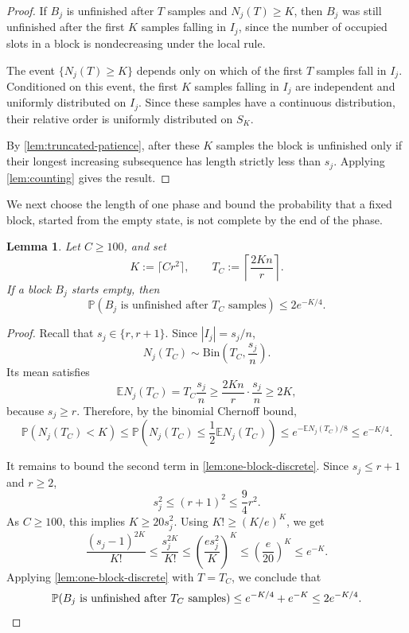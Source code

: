 \documentclass[11pt,reqno,letterpaper]{amsart}
\newtheorem{lemma}[theorem]{Lemma}
\theoremstyle{definition}
\numberwithin{equation}{section}
\renewcommand{\P}{\mathbb{P}}
\newcommand{\mb}{\mathbb}
\begin{document}
\begin{proof}
If \(B_j\) is unfinished after \(T\) samples and \(N_j(T)\ge K\), then \(B_j\) was still unfinished after the first \(K\) samples falling in \(I_j\), since the number of occupied slots in a block is nondecreasing under the local rule.

The event \(\{N_j(T)\ge K\}\) depends only on which of the first \(T\) samples fall in \(I_j\). Conditioned on this event, the first \(K\) samples falling in \(I_j\) are independent and uniformly distributed on \(I_j\). Since these samples have a continuous distribution, their relative order is uniformly distributed on \(S_K\).

By \cref{lem:truncated-patience}, after these \(K\) samples the block is unfinished only if their longest increasing subsequence has length strictly less than \(s_j\). Applying \cref{lem:counting} gives the result.
\end{proof}

We next choose the length of one phase and bound the probability that a fixed block, started from the empty state, is not complete by the end of the phase.

\begin{lemma}\label{lem:one-phase-failure-discrete}
Let \(C\ge100\), and set
\[
K:=\lceil Cr^2\rceil,
\qquad
T_C:=\left\lceil \frac{2Kn}{r}\right\rceil.
\]
If a block \(B_j\) starts empty, then
\[
\P(\text{\(B_j\) is unfinished after \(T_C\) samples})
\le
2e^{-K/4}.
\]
\end{lemma}

\begin{proof}
Recall that \(s_j\in\{r,r+1\}\). Since \(|I_j|=s_j/n\),
\[
N_j(T_C)\sim \mathrm{Bin}\left(T_C,\frac{s_j}{n}\right).
\]
Its mean satisfies
\[
\mb{E}N_j(T_C)
=
T_C\frac{s_j}{n}
\ge
\frac{2Kn}{r}\cdot \frac{s_j}{n}
\ge
2K,
\]
because \(s_j\ge r\). Therefore, by the binomial Chernoff bound,
\[
\P(N_j(T_C)<K)
\le
\P\left(N_j(T_C)\le \frac12\mb{E}N_j(T_C)\right)
\le
e^{-\mb{E}N_j(T_C)/8}
\le
e^{-K/4}.
\]

It remains to bound the second term in \cref{lem:one-block-discrete}. Since \(s_j\le r+1\) and \(r\ge2\),
\[
s_j^2\le (r+1)^2\le \frac94r^2.
\]
As \(C\ge100\), this implies \(K\ge20s_j^2\). Using \(K!\ge (K/e)^K\), we get
\[
\frac{(s_j-1)^{2K}}{K!}
\le
\frac{s_j^{2K}}{K!}
\le
\left(\frac{es_j^2}{K}\right)^K
\le
\left(\frac e{20}\right)^K
\le
e^{-K}.
\]
Applying \cref{lem:one-block-discrete} with \(T=T_C\), we conclude that
\[
\P(\text{\(B_j\) is unfinished after \(T_C\) samples})
\le
e^{-K/4}+e^{-K}
\le
2e^{-K/4}. \qedhere
\]
\end{proof}
\end{document}
